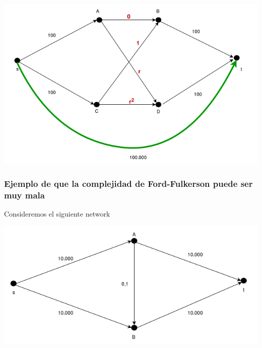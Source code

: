 \documentclass[10pt,a4paper]{article}
\begin{document}
\begin{center}

    \begin{adjustbox}{max size={\textwidth}{\textheight}}
        \includegraphics{definitions/ff_todo_mal.png}
        \end{adjustbox}
    
\end{center}

\subsubsection*{Ejemplo de que la complejidad de Ford-Fulkerson puede ser muy mala}

Consideremos el siguiente network

\begin{center}

    \begin{adjustbox}{max size={\textwidth}{\textheight}}
        \includegraphics{definitions/ss_problem.png}
        \end{adjustbox}
    
\end{center}
\end{document}
